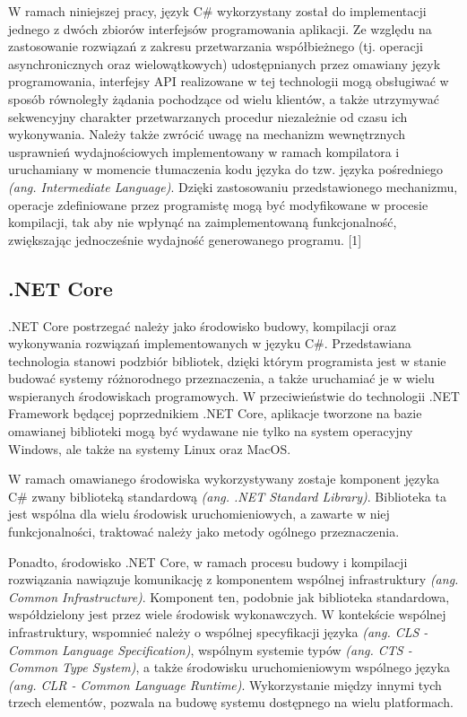 W ramach niniejszej pracy, język C\# wykorzystany został do implementacji jednego z dwóch zbiorów interfejsów programowania aplikacji. Ze względu na zastosowanie rozwiązań z zakresu przetwarzania współbieżnego (tj. operacji asynchronicznych oraz wielowątkowych) udostępnianych przez omawiany język programowania, interfejsy API realizowane w tej technologii mogą obsługiwać w sposób równoległy żądania pochodzące od wielu klientów, a także utrzymywać sekwencyjny charakter przetwarzanych procedur niezależnie od czasu ich wykonywania. Należy także zwrócić uwagę na mechanizm wewnętrznych usprawnień wydajnościowych implementowany w ramach kompilatora i uruchamiany w momencie tłumaczenia kodu języka do tzw. języka pośredniego \textit{(ang. Intermediate Language)}. Dzięki zastosowaniu przedstawionego mechanizmu, operacje zdefiniowane przez programistę mogą być modyfikowane w procesie kompilacji, tak aby nie wpłynąć na zaimplementowaną funkcjonalność, zwiększając jednocześnie wydajność generowanego programu. [1]
\subsection*{.NET Core}
.NET Core postrzegać należy jako środowisko budowy, kompilacji oraz wykonywania rozwiązań implementowanych w języku C\#. Przedstawiana technologia stanowi podzbiór bibliotek, dzięki którym programista jest w stanie budować systemy różnorodnego przeznaczenia, a także uruchamiać je w wielu wspieranych środowiskach programowych. W przeciwieństwie do technologii .NET Framework będącej poprzednikiem .NET Core, aplikacje tworzone na bazie omawianej biblioteki mogą być wydawane nie tylko na system operacyjny Windows, ale także na systemy Linux oraz MacOS.

W ramach omawianego środowiska wykorzystywany zostaje komponent języka C\# zwany biblioteką standardową \textit{(ang. .NET Standard Library)}. Biblioteka ta jest wspólna dla wielu środowisk uruchomieniowych, a zawarte w niej funkcjonalności, traktować należy jako metody ogólnego przeznaczenia.

Ponadto, środowisko .NET Core, w ramach procesu budowy i kompilacji rozwiązania nawiązuje komunikację z komponentem wspólnej infrastruktury \textit{(ang. Common Infrastructure)}. Komponent ten, podobnie jak biblioteka standardowa, współdzielony jest przez wiele środowisk wykonawczych. W kontekście wspólnej infrastruktury, wspomnieć należy o wspólnej specyfikacji języka \textit{(ang. CLS - Common Language Specification)}, wspólnym systemie typów \textit{(ang. CTS - Common Type System)}, a także środowisku uruchomieniowym wspólnego języka \textit{(ang. CLR - Common Language Runtime)}. Wykorzystanie między innymi tych trzech elementów, pozwala na budowę systemu dostępnego na wielu platformach.

